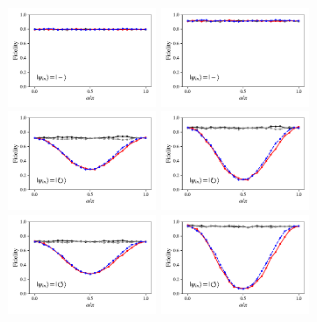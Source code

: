 \documentclass[a4paper]{article}
\begin{document}
\begin{figure}[H]
	\\
	\includegraphics[width=0.35\textwidth]{fidelity_qc8_mit1_state3}
	\includegraphics[width=0.35\textwidth]{fidelity_qc8_mit0_state3}
	\\
	\includegraphics[width=0.35\textwidth]{fidelity_qc8_mit1_state4}
	\includegraphics[width=0.35\textwidth]{fidelity_qc8_mit0_state4}
	\\
	\includegraphics[width=0.35\textwidth]{fidelity_qc8_mit1_state5}
	\includegraphics[width=0.35\textwidth]{fidelity_qc8_mit0_state5}
\end{figure}
\end{document}
